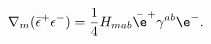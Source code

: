 \begin{equation}
   \nabla_m (\bar{\epsilon}^+\epsilon^-) 
      = \frac{1}{4}H_{mab}\bar\e^+\gamma^{ab}\e^- .
\end{equation}

